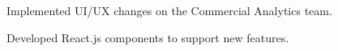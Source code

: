 \documentclass[]{deedy-resume-openfont}
\begin{document}
\begin{minipage}[t]{0.66\textwidth}
\begin{tightemize}
\item Implemented UI/UX changes on the Commercial Analytics team.
\item Developed React.js components to support new features.
\end{tightemize}
\sectionsep








\end{minipage}
\end{document}
